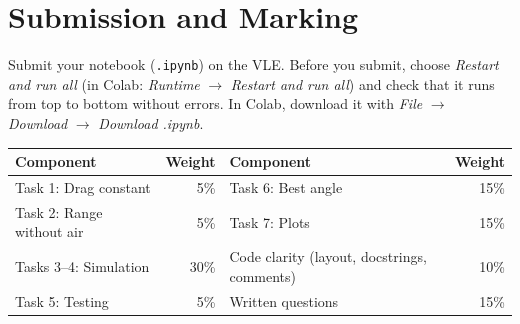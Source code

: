 \documentclass[11pt,a4paper]{article}
\newcommand{\code}[1]{\texttt{\color{codetext}#1}}
\begin{document}
\section{Submission and Marking}
Submit your notebook (\code{.ipynb}) on the VLE. Before you submit, choose \emph{Restart and run all} (in Colab: \emph{Runtime} $\to$ \emph{Restart and run all}) and check that it runs from top to bottom without errors. In Colab, download it with \emph{File} $\to$ \emph{Download} $\to$ \emph{Download .ipynb}.

\begin{center}
\small
\begin{tabular}{@{}lr@{\qquad\qquad}lr@{}}
  \toprule
  \textbf{Component} & \textbf{Weight} & \textbf{Component} & \textbf{Weight} \\
  \midrule
  Task 1: Drag constant      & 5\%  & Task 6: Best angle                     & 15\% \\
  Task 2: Range without air & 5\%  & Task 7: Plots                          & 15\% \\
  Tasks 3--4: Simulation     & 30\% & Code clarity (layout, docstrings, comments) & 10\% \\
  Task 5: Testing            & 5\%  & Written questions                      & 15\% \\
  \bottomrule
\end{tabular}
\end{center}
\end{document}
